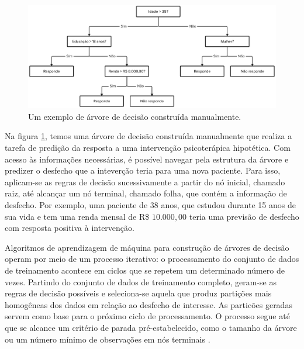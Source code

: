 \begin{figure}[h!]
    \centering
    \includegraphics[width=\textwidth]{./03-exemplo/imagens/arvore-exemplo.png}
    \caption{Um exemplo de árvore de decisão construída manualmente.}
    \label{fig:arvore-exemplo}
\end{figure}

Na figura \ref{fig:arvore-exemplo}, temos uma árvore de decisão construída manualmente que realiza a tarefa de predição da resposta a uma intervenção psicoterápica hipotética.
Com acesso às informações necessárias, é possível navegar pela estrutura da árvore e predizer o desfecho que a inteverção teria para uma nova paciente. Para isso, aplicam-se
as regras de decisão sucessivamente a partir do nó inicial, chamado raiz, até alcançar um nó terminal, chamado folha, que contém a informação de desfecho.  Por exemplo,
uma paciente de 38 anos, que estudou durante 15 anos de sua vida e tem uma renda mensal de R\$ $10.000,00$ teria uma previsão de desfecho com resposta positiva à intervenção.

Algoritmos de aprendizagem de máquina para construção de árvores de decisão operam por meio de um processo iterativo: o processamento do conjunto de dados de treinamento
acontece em ciclos que se repetem um determinado número de vezes. Partindo do conjunto de dados de treinamento completo, geram-se as regras de decisão possíveis e seleciona-se
aquela que produz partições mais homogêneas dos dados em relação ao desfecho de interesse. As particões geradas servem como base para o próximo ciclo de processamento. O processo
segue até que se alcance um critério de parada pré-estabelecido, como o tamanho da árvore ou um número mínimo de observações em nós terminais \cite{Bi2019}.

